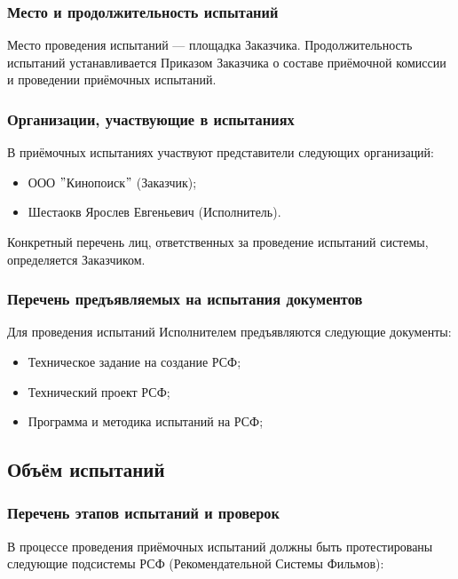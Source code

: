 \subsubsection{Место и продолжительность испытаний}

Место проведения испытаний — площадка Заказчика.
Продолжительность испытаний устанавливается Приказом Заказчика о составе приёмочной комиссии и проведении приёмочных испытаний.

\subsubsection{Организации, участвующие в испытаниях}

В приёмочных испытаниях участвуют представители следующих организаций:

\begin{itemize}
	\item ООО \("\)Кинопоиск\("\) (Заказчик);
	\item Шестаокв Ярослев Евгеньевич (Исполнитель).
\end{itemize}

Конкретный перечень лиц, ответственных за проведение испытаний системы, определяется Заказчиком.
\subsubsection{Перечень предъявляемых на испытания документов}

Для проведения испытаний Исполнителем предъявляются следующие документы:

\begin{itemize}
	\item Техническое задание на создание РСФ;
	\item Технический проект РСФ;
	\item Программа и методика испытаний на РСФ;
\end{itemize}
\subsection{Объём испытаний}

\subsubsection{Перечень этапов испытаний и проверок}

В процессе проведения приёмочных испытаний должны быть протестированы следующие подсистемы РСФ (Рекомендательной Системы Фильмов):

